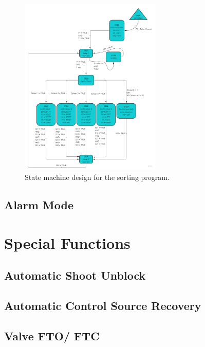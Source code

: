         \begin{figure}[H]
            \centering
            \includegraphics[width = 0.6\textwidth]{2_images/sortStateMachine}
            \caption{State machine design for the sorting program.}
            \label{fig:sortStateMachine}
        \end{figure}
        
    \subsection{Alarm Mode}



\section{Special Functions}

    \subsection{Automatic Shoot Unblock}

    \subsection{Automatic Control Source Recovery}

    \subsection{Valve FTO/ FTC} \label{sec:valveFtoFtc}

    